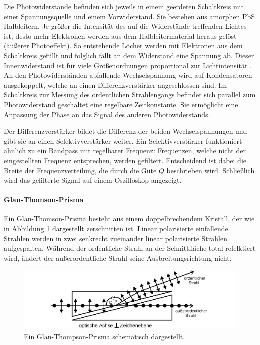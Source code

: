 Die Photowiderstände befinden sich jeweils in einem geerdeten Schaltkreis
mit einer Spannungsquelle und einem Vorwiderstand.
Sie bestehen aus amorphen PbS Halbleitern.
Je größer die Intensität des auf die Widerstände treffenden Lichtes ist,
desto mehr Elektronen werden
aus dem Halbleitermaterial heraus gelöst (äußerer Photoeffekt).
So entstehende Löcher werden mit Elektronen aus dem Schaltkreis gefüllt und
folglich fällt an dem Widerstand eine Spannung ab. Dieser Innenwiderstand
ist für viele Größenordnungen proportional zur Lichtintensität
\cite[11]{anleitung}.
An den Photowiderständen abfallende Wechselspannung wird auf Kondensatoren
ausgekoppelt, welche an einen Differenzverstärker angeschlossen sind.
Im Schaltkreis zur Messung des ordentlichen Strahlengangs
befindet sich parallel zum Photowiderstand geschaltet eine
regelbare Zeitkonstante. Sie ermöglicht eine Anpassung der
Phase an das Signal des anderen Photowiderstands.

Der Differenzverstärker bildet die Differenz der beiden
Wechselspannungen und gibt sie an
einen Selektivverstärker weiter.
Ein Selektivverstärker funktioniert ähnlich zu ein Bandpass mit regelbarer
Frequenz: Frequenzen, welche nicht der eingestellten Frequenz entsprechen,
werden gefiltert. Entscheidend ist dabei die Breite der Frequenzverteilung,
die durch die Güte $Q$ beschrieben wird.
Schließlich wird das gefilterte Signal auf einem Oszilloskop angezeigt.

\paragraph{Glan-Thomson-Prisma}
Ein Glan-Thomson-Prisma besteht aus einem doppelbrechendem Kristall,
der wie in Abbildung \ref{fig:GTP} dargestellt zerschnitten ist.
Linear polarisierte einfallende Strahlen werden in zwei senkrecht zueinander
linear polarisierte Strahlen aufgespalten.
Während der ordentliche Strahl an der Schnittfläche total refelktiert wird,
ändert der außerordentliche Strahl seine Ausbreitungsrichtung nicht.
\begin{figure}
  \centering
  \includegraphics[width=\textwidth]{images/gtp.pdf}
  \caption{Ein Glan-Thompson-Prisma schematisch dargestellt\cite[17]{anleitung}.}
  \label{fig:GTP}
\end{figure}

